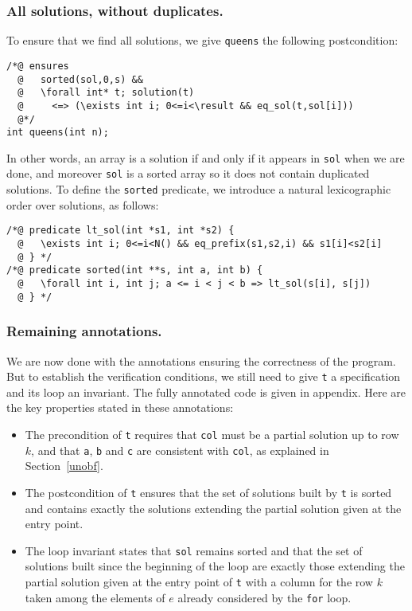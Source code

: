 \documentclass[a4paper]{llncs}
\begin{document}
\subsubsection{All solutions, without duplicates.}
To ensure that we find all solutions, we give \texttt{queens} the
following postcondition:
\begin{verbatim}
/*@ ensures 
  @   sorted(sol,0,s) &&
  @   \forall int* t; solution(t) 
  @     <=> (\exists int i; 0<=i<\result && eq_sol(t,sol[i]))
  @*/
int queens(int n);
\end{verbatim}
In other words, an array is a solution if and only if it appears in
\texttt{sol} when we are done, and moreover \texttt{sol} is a sorted
array so it does not contain duplicated solutions. To define the
\texttt{sorted} predicate, we introduce a natural lexicographic order
over solutions, as follows:
\begin{verbatim}
/*@ predicate lt_sol(int *s1, int *s2) {
  @   \exists int i; 0<=i<N() && eq_prefix(s1,s2,i) && s1[i]<s2[i]
  @ } */
/*@ predicate sorted(int **s, int a, int b) {
  @   \forall int i, int j; a <= i < j < b => lt_sol(s[i], s[j])
  @ } */
\end{verbatim}

\subsubsection{Remaining annotations.} 
We are now done with the annotations ensuring the correctness of the
program. But to establish the verification conditions, we still need
to give \texttt{t} a specification and its loop an invariant. The
fully annotated code is given in appendix. Here are the key properties
stated in these annotations:
\begin{itemize}
\item The precondition of \texttt{t} requires that \texttt{col} must be a
  partial solution up to row $k$, and that \texttt{a},
  \texttt{b} and \texttt{c} are consistent with \texttt{col}, as
  explained in Section~\ref{unobf}.
\item The postcondition of \texttt{t} ensures that the set of
  solutions built by \texttt{t} is sorted and contains exactly the 
  solutions extending the partial solution given at the entry point.
\item The loop invariant states that \texttt{sol} remains sorted and
  that the set of solutions built since the beginning of the loop are
  exactly those extending the partial solution given at the entry
  point of \texttt{t} with a column for the row $k$ taken among the
  elements of $e$ already considered by the \texttt{for} loop.
\end{itemize}
\end{document}
